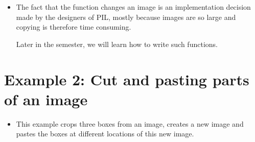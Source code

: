 \documentclass[letterpaper,10pt,english]{sphinxmanual}
\begin{document}
\begin{itemize}
\item {} 
The fact that the function  changes an image is an
implementation decision made by the designers of PIL, mostly
because images are so large and copying is therefore time
consuming.

Later in the semester, we will learn how to write such functions.

\end{itemize}


\section{Example 2: Cut and pasting parts of an image}
\label{\detokenize{lecture_notes/lec07_modules_images:example-2-cut-and-pasting-parts-of-an-image}}\begin{itemize}
\item {} 
This example crops three boxes from an image, creates a new image and
pastes the boxes at different locations of this new image.

%
\begin{sphinxVerbatim}[commandchars=\\\{\}]
   

  
  

  
  
  

  


\end{sphinxVerbatim}
\end{itemize}
\end{document}
